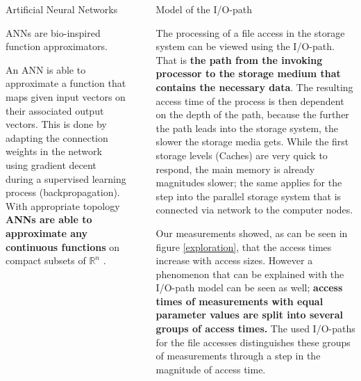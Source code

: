 \documentclass[final]{beamer}
\newlength{\sepwid}
\newlength{\onecolwid}
\begin{document}
\begin{frame}[t]
\begin{columns}[t]
\begin{column}{\onecolwid}
\begin{block}{Artificial Neural Networks}
	
	ANNs are bio-inspired function approximators.
	
	
	An ANN is able to approximate a function that maps given input vectors on their associated output vectors.
	This is done by adapting the connection weights in the network using gradient decent during a supervised learning process (backpropagation).
	With appropriate topology \textbf{ANNs are able to approximate any continuous functions} on compact subsets of $\mathbb{R}^n$ \cite{cybenko:mcss}.
	
	
\end{block}

\end{column} %

\begin{column}{\sepwid}\end{column} %

\begin{column}{\onecolwid} %
	

\begin{block}{Model of the I/O-path}
	
	The processing of a file access in the storage system can be viewed using the I/O-path.
	That is \textbf{the path from the invoking processor to the storage medium that contains the necessary data}.
	The resulting access time of the process is then dependent on the depth of the path, because the further the path leads into the storage system, the slower the storage media gets.
	While the first storage levels (Caches) are very quick to respond, the main memory is already magnitudes slower; the same applies for the step into the parallel storage system that is connected via network to the computer nodes.\medskip
	
	Our measurements showed, as can be seen in figure \ref{exploration}, that the access times increase with access sizes.
	However a phenomenon that can be explained with the I/O-path model can be seen as well; \textbf{access times of measurements with equal parameter values are split into several groups of access times.}
	The used I/O-paths for the file accesses distinguishes these groups of measurements through a step in the magnitude of access time.
	

\end{block}
\end{column}
\end{columns}
\end{frame}
\end{document}
